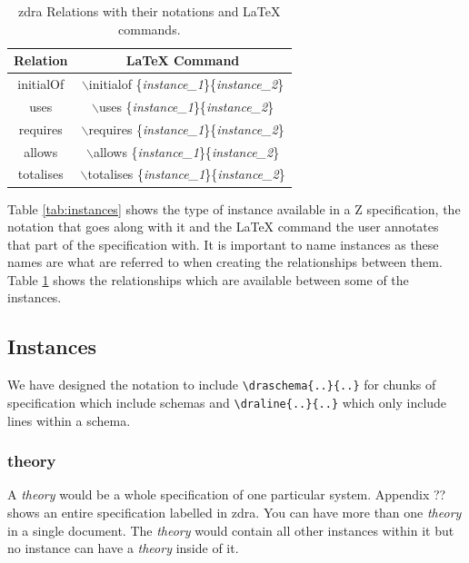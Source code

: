 \begin{table}[H]
\begin{tabular}{| c | c |}
\hline
\textbf{Relation} &  \textbf{\LaTeX{} Command} \\
\hline
initialOf &  $\backslash$initialof \{\textit{instance\_1}\}\{\textit{instance\_2}\}  \\
\hline
uses & $\backslash$uses \{\textit{instance\_1}\}\{\textit{instance\_2}\}\\
\hline
requires & $\backslash$requires \{\textit{instance\_1}\}\{\textit{instance\_2}\}\\
\hline
allows & $\backslash$allows \{\textit{instance\_1}\}\{\textit{instance\_2}\}\\
\hline
totalises & $\backslash$totalises \{\textit{instance\_1}\}\{\textit{instance\_2}\}\\
\hline
\end{tabular}
\caption{\label{tab:relations} \gls{zdra} Relations with their notations and \LaTeX{} commands.}
\end{table}

Table \ref{tab:instances} shows the type of instance available in a Z specification, the notation that goes along with it and the \LaTeX{} command the user annotates that part of the specification with. It is important to name instances as these names are what are referred to when creating the relationships between them. Table \ref{tab:relations} shows the relationships which are available between some of the instances. 

\subsection{Instances}

We have designed the notation to include \verb|\draschema{..}{..}| for chunks of specification which include schemas and \verb|\draline{..}{..}| which only include lines within a schema.

\subsubsection{theory}

A \emph{theory} would be a whole specification of one particular system. Appendix ?? shows an entire specification labelled in \gls{zdra}. You can have more than one \emph{theory} in a single document. The \emph{theory} would contain all other instances within it but no instance can have a \emph{theory} inside of it.

